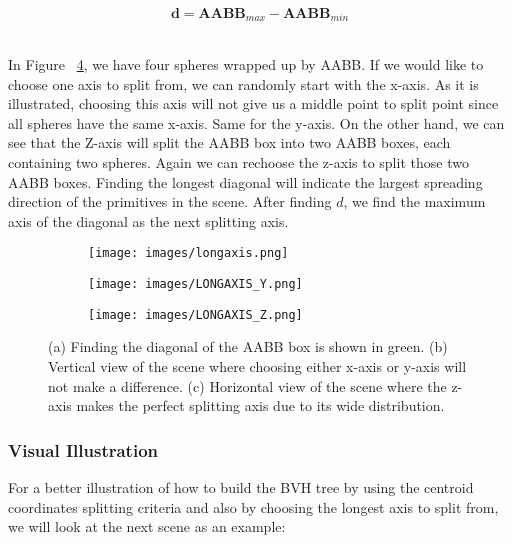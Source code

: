 \documentclass[11pt,a4paper]{article}
\begin{document}
\begin{equation}
\textbf{d} = \textbf{AABB}_{max} - \textbf{AABB}_{min}
\end{equation}

\noindent
\\
In Figure ~\ref{fig:aabbexample}, we have four spheres wrapped up by AABB. If we would like to choose one axis to split from, we can randomly start with the x-axis. As it is illustrated, choosing this axis will not give us a middle point to split point since all spheres have the same x-axis. Same for the y-axis. On the other hand, we can see that the Z-axis will split the AABB box into two AABB boxes, each containing two spheres. Again we can rechoose the z-axis to split those two AABB boxes. Finding the longest diagonal will indicate the largest spreading direction of the primitives in the scene. After finding $d$, we find the maximum axis of the diagonal as the next splitting axis.

\begin{figure}[H]	
     \centering
     \begin{subfigure}[t]{0.3\textwidth}
         \centering
         \texttt{[image: images/longaxis.png]}
         \caption{}
         \label{fig:pi_4000}
     \end{subfigure}
     \hfill
     \begin{subfigure}[t]{0.3\textwidth}
         \centering
         \texttt{[image: images/LONGAXIS\_Y.png]}
         \caption{}
         \label{fig:pi_5000}
     \end{subfigure}
     \hfill
     \begin{subfigure}[t]{0.3\textwidth}
         \centering
         \texttt{[image: images/LONGAXIS\_Z.png]}
         \caption{}
         \label{fig:pi_18000}
     \end{subfigure}
        \captionsetup{justification=centering,margin=2cm}
        \caption{(a) Finding the diagonal of the AABB box is shown in green. (b) Vertical view of the scene where choosing either x-axis or y-axis will not make a difference. (c) Horizontal view of the scene where the z-axis makes the perfect splitting axis due to its wide distribution.}
        \label{fig:aabbexample}
\end{figure}

\subsubsection{Visual Illustration}
For a better illustration of how to build the BVH tree by using the centroid coordinates splitting criteria and also by choosing the longest axis to split from, we will look at the next scene as an example: 
\end{document}
